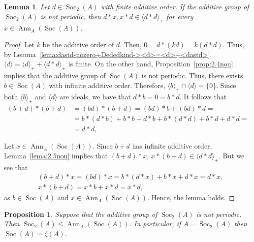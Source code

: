 \documentclass[12pt, a4paper, english]{article}
\newtheorem{lema}[teorema]{Lemma}
\newtheorem{proposicio}[teorema]{Proposition}
\theoremstyle{definition}
\DeclareMathOperator{\Ann}{Ann}
\DeclareMathOperator{\Soc}{Soc}
\begin{document}
\begin{lema}
\label{lema:2.6nou}
Let $d \in \Soc_2(A)$ with finite additive order. If the additive group of $\Soc_2(A)$ is not periodic, then $d \ast x, x \ast d \in \langle d \ast d \rangle_+$ for every  $x\in \Ann_A(\Soc(A))$.
\end{lema}

\begin{proof}
Let $k$ be the additive order of $d$. Then, $0 = d \ast (kd) = k(d\ast d)$. Thus, by Lemma~\ref{lema:dastd-nozero+Dededkind-><d>=<d>+<dastd>}, $\langle d \rangle = \langle d \rangle_+ + \langle d\ast d \rangle_+$ is finite. On the other hand, Proposition~\ref{prop:2.4nou} implies that the additive group of $\Soc(A)$ is not periodic. Thus, there exists $b \in \Soc(A)$ with infinite additive order. Therefore, $\langle b \rangle_+ \cap \langle d \rangle = \{0\}$. Since both $\langle b\rangle_+$ and $\langle d \rangle$ are ideals, we have that $d \ast b = 0 = b \ast d$. It follows that
\begin{align*}
(b+d) \ast (b+d) & = (bd) \ast (b+d) = (bd) \ast b + (bd) \ast d = \\
&= b \ast (d \ast b) + b\ast b + d \ast b + b \ast (d\ast d) + b \ast d + d\ast d = \\
& = d\ast d,
\end{align*}

Let $x\in \Ann_A(\Soc(A))$. Since $b+d$ has infinite additive order, Lemma~\ref{lema:2.5nou} implies that $(b+d)\ast x$, $x \ast (b+d) \in \langle d \ast d\rangle_+$. But we see that
\begin{align*}
& (b+d) \ast x = (bd) \ast x = b \ast (d \ast x) + b\ast x + d \ast x = d \ast x, \\
& x \ast (b+d) = x \ast b + x \ast d = x \ast d,
\end{align*}
as $b \in\Soc(A)$ and $x\in \Ann_A(\Soc(A))$. Hence, the lemma holds.
\end{proof}


\begin{proposicio}
\label{prop:2.14nou}
Suppose that the additive group of $\Soc_2(A)$ is not periodic. Then $\Soc_2(A) \leq \Ann_A(\Soc(A))$. In particular, if $A = \Soc_2(A)$ then $\Soc(A) = \zeta(A)$.
\end{proposicio}
\end{document}
